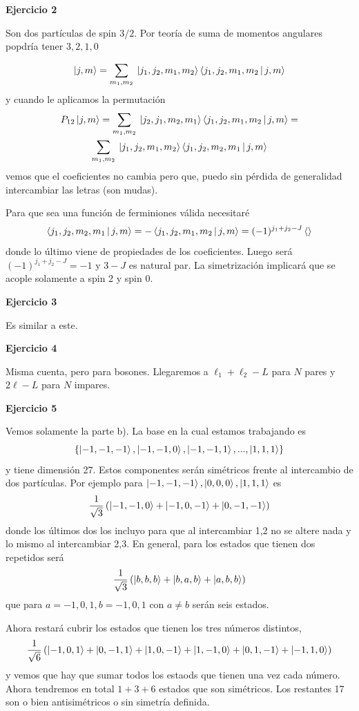 \documentclass[10pt,oneside]{CBFT_book}
\begin{document}
\begin{ejemplo}{\bf Ejercicio 2}

Son dos partículas de spin $3/2$. Por teoría de suma de momentos angulares popdría tener
$3,2,1,0$

\[
	\Ket{j, m} = \sum_{m_1,m_2} \: \Ket{j_1,j_2,m_1,m_2} \Braket{j_1,j_2,m_1,m_2|j,m}
\]
y cuando le aplicamos la permutación
\begin{multline*}
	P_{12} \Ket{j, m} = \sum_{m_1,m_2} \: \Ket{j_2,j_1,m_2,m_1} \Braket{j_1,j_2,m_1,m_2|j,m} = \\
	\sum_{m_1,m_2} \: \Ket{j_1,j_2,m_1,m_2} \Braket{j_1,j_2,m_2,m_1|j,m}
\end{multline*}
vemos que el coeficientes no cambia pero que, puedo sin pérdida de generalidad intercambiar las
letras (son mudas).

Para que sea una función de ferminiones válida necesitaré
\[
	\Braket{j_1,j_2,m_2,m_1|j,m} = - \Braket{j_1,j_2,m_1,m_2|j,m} = (-1)^{j_1+j_2-J} \Braket{}
\]
donde lo último viene de propiedades de los coeficientes.
Luego será $(-1)^{j_1+j_2-J} = -1$ y $3-J$ es natural par.
La simetrización implicará que se acople solamente a spin 2 y spin 0.

\end{ejemplo}

\begin{ejemplo}{\bf Ejercicio 3}
 
Es similar a este. 
 
\end{ejemplo}

\begin{ejemplo}{\bf Ejercicio 4}
 
Misma cuenta, pero para bosones. Llegaremos a $\ell_1 + \ell_2 - L $  para $N$ pares y $2\ell - L$
para $N$ impares.
 
\end{ejemplo}

\begin{ejemplo}{\bf Ejercicio 5}

Vemos solamente la parte b). La base en la cual estamos trabajando es
\[
	\{  \Ket{-1,-1,-1}, \Ket{-1,-1,0}, \Ket{-1,-1,1}, ..., \Ket{1,1,1} \}
\]
y tiene dimensión 27. Estos componentes serán simétricos frente al intercambio de dos partículas.
Por ejemplo para $\Ket{-1,-1,-1}, \Ket{0,0,0}, \Ket{1,1,1}$ es
\[
	\frac{1}{\sqrt{3}} \left( \Ket{-1,-1,0} + \Ket{-1,0,-1} + \Ket{0,-1,-1}  \right)
\]
donde los últimos dos los incluyo para que al intercambiar 1,2 no se altere nada y lo mismo al
intercambiar 2,3.
En general, para los estados que tienen dos repetidos será
\[
	\frac{1}{\sqrt{3}} \left( \Ket{b,b,b} + \Ket{b,a,b} + \Ket{a,b,b}  \right)
\]
que para $a=-1,0,1, b=-1,0,1$ con $a\neq b$ serán seis estados.

Ahora restará cubrir los estados que tienen los tres números distintos, 
\[
	\frac{1}{\sqrt{6}} \left( 
	\Ket{-1,0,1} + \Ket{0,-1,1} + \Ket{1,0,-1} +
	\Ket{1,-1,0} + \Ket{0,1,-1} + \Ket{-1,1,0}
	\right)
\]
y vemos que hay que sumar todos los estaods que tienen una vez cada número.
Ahora tendremos en total $1+3+6$ estados que son simétricos. Los restantes 17 son o bien
antisimétricos o sin simetría definida.


\end{ejemplo}

\end{document}
